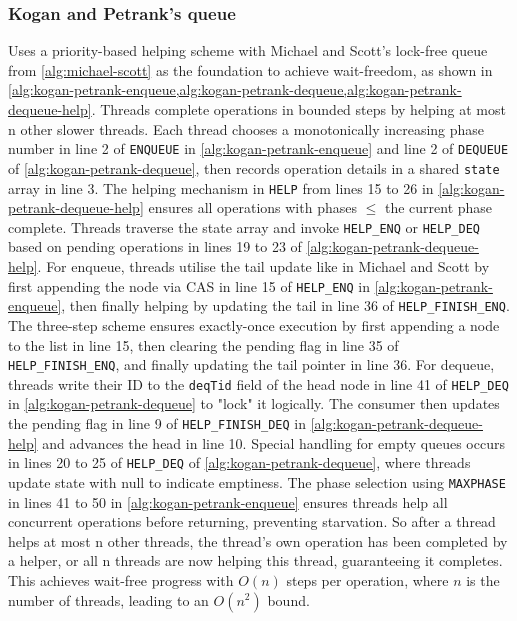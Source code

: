 \subsubsection{Kogan and Petrank's queue} 
Uses a priority-based helping scheme with Michael and Scott's lock-free queue from \cref{alg:michael-scott} as the foundation to achieve wait-freedom, as shown in \cref{alg:kogan-petrank-enqueue,alg:kogan-petrank-dequeue,alg:kogan-petrank-dequeue-help}. Threads complete operations in bounded steps by helping at most n other slower threads. Each thread chooses a monotonically increasing phase number in line 2 of \texttt{ENQUEUE} in \cref{alg:kogan-petrank-enqueue} and line 2 of \texttt{DEQUEUE} of \cref{alg:kogan-petrank-dequeue}, then records operation details in a shared \texttt{state} array in line 3. The helping mechanism in \texttt{HELP} from lines 15 to 26 in \cref{alg:kogan-petrank-dequeue-help} ensures all operations with phases $\leq$ the current phase complete. Threads traverse the state array and invoke \texttt{HELP\_ENQ} or \texttt{HELP\_DEQ} based on pending operations in lines 19 to 23 of \cref{alg:kogan-petrank-dequeue-help}. For enqueue, threads utilise the tail update like in Michael and Scott by first appending the node via \ac{CAS} in line 15 of \texttt{HELP\_ENQ} in \cref{alg:kogan-petrank-enqueue}, then finally helping by updating the tail in line 36 of \texttt{HELP\_FINISH\_ENQ}. The three-step scheme ensures exactly-once execution by first appending a node to the list in line 15, then clearing the pending flag in line 35 of \texttt{HELP\_FINISH\_ENQ}, and finally updating the tail pointer in line 36. For dequeue, threads write their ID to the \texttt{deqTid} field of the head node in line 41 of \texttt{HELP\_DEQ} in \cref{alg:kogan-petrank-dequeue} to "lock" it logically. The consumer then updates the pending flag in line 9 of \texttt{HELP\_FINISH\_DEQ} in \cref{alg:kogan-petrank-dequeue-help} and advances the head in line 10. Special handling for empty queues occurs in lines 20 to 25 of \texttt{HELP\_DEQ} of \cref{alg:kogan-petrank-dequeue}, where threads update state with null to indicate emptiness. The phase selection using \texttt{MAXPHASE} in lines 41 to 50 in \cref{alg:kogan-petrank-enqueue} ensures threads help all concurrent operations before returning, preventing starvation. So after a thread helps at most n other threads, the thread's own operation has been completed by a helper, or all n threads are now helping this thread, guaranteeing it completes. This achieves wait-free progress with $O(n)$ steps per operation, where $n$ is the number of threads, leading to an $O(n^2)$ bound. \cite{Kogan2011WaitFreeQueues}

